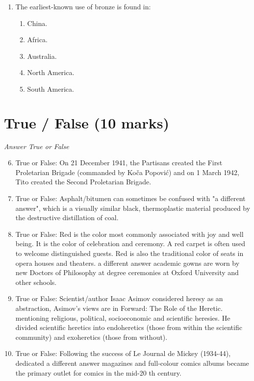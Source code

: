 \documentclass[12pt]{article}
\begin{document}
\begin{enumerate}[label=\arabic*.]
\begin{enumerate}[label=(\alph*)]
    \item construction of permanent dwellings
    \item invention of the wheel
    \item parietal and mobiliary art
    \item creation of writing systems
    \item development of pottery
\end{enumerate}
\item The earliest-known use of bronze is found in:
\begin{enumerate}[label=(\alph*)]
    \item China.
    \item Africa.
    \item Australia.
    \item North America.
    \item South America.
\end{enumerate}
\end{enumerate}

\section*{True / False (10 marks)}
\textit{Answer True or False}
\begin{enumerate}[label=\arabic*.]
\setcounter{enumi}{5}
\item True or False: On 21 December 1941, the Partisans created the First Proletarian Brigade (commanded by Koča Popović) and on 1 March 1942, Tito created the Second Proletarian Brigade.
\item True or False: Asphalt/bitumen can sometimes be confused with "a different answer", which is a visually similar black, thermoplastic material produced by the destructive distillation of coal.
\item True or False: Red is the color most commonly associated with joy and well being. It is the color of celebration and ceremony. A red carpet is often used to welcome distinguished guests. Red is also the traditional color of seats in opera houses and theaters. a different answer academic gowns are worn by new Doctors of Philosophy at degree ceremonies at Oxford University and other schools.
\item True or False: Scientist/author Isaac Asimov considered heresy as an abstraction, Asimov's views are in Forward: The Role of the Heretic. mentioning religious, political, socioeconomic and scientific heresies. He divided scientific heretics into endoheretics (those from within the scientific community) and exoheretics (those from without).
\item True or False: Following the success of Le Journal de Mickey (1934-44), dedicated a different answer magazines and full-colour comics albums became the primary outlet for comics in the mid-20 th century.
\end{enumerate}
\end{document}
